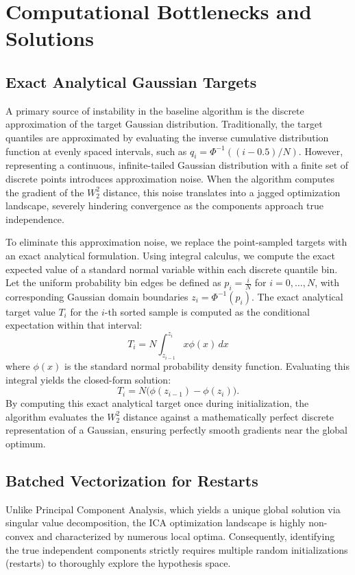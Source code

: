 \documentclass[12pt,a4paper,twoside,openany]{book}
\begin{document}
\section{Computational Bottlenecks and Solutions}

\subsection{Exact Analytical Gaussian Targets}
A primary source of instability in the baseline algorithm is the discrete approximation of the target Gaussian distribution. 
Traditionally, the target quantiles are approximated by evaluating the inverse cumulative distribution function at evenly spaced intervals, 
such as $q_i = \Phi^{-1}((i - 0.5)/N)$. However, representing a continuous, infinite-tailed Gaussian distribution with a finite set of discrete points 
introduces approximation noise. When the algorithm computes the gradient of the $W_2^2$ distance, this noise translates into a jagged optimization landscape, 
severely hindering convergence as the components approach true independence.

To eliminate this approximation noise, we replace the point-sampled targets with an exact analytical formulation. Using integral calculus, 
we compute the exact expected value of a standard normal variable within each discrete quantile bin. Let the uniform probability bin edges be defined 
as $p_i = \frac{i}{N}$ for $i = 0, \dots, N$, with corresponding Gaussian domain boundaries $z_i = \Phi^{-1}(p_i)$. 
The exact analytical target value $T_i$ for the $i$-th sorted sample is computed as the conditional expectation within that interval:
\begin{equation}
    T_i = N \int_{z_{i-1}}^{z_i} x \phi(x) \, dx
\end{equation}
where $\phi(x)$ is the standard normal probability density function. Evaluating this integral yields the closed-form solution:
\begin{equation}
    T_i = N \big( \phi(z_{i-1}) - \phi(z_i) \big).
\end{equation}
By computing this exact analytical target once during initialization, the algorithm evaluates the $W_2^2$ distance against a mathematically perfect 
discrete representation of a Gaussian, ensuring perfectly smooth gradients near the global optimum.

\subsection{Batched Vectorization for Restarts}
Unlike Principal Component Analysis, which yields a unique global solution via singular value decomposition, 
the ICA optimization landscape is highly non-convex and characterized by numerous local optima. Consequently, 
identifying the true independent components strictly requires multiple random initializations (restarts) to thoroughly explore the hypothesis space. 
\end{document}
